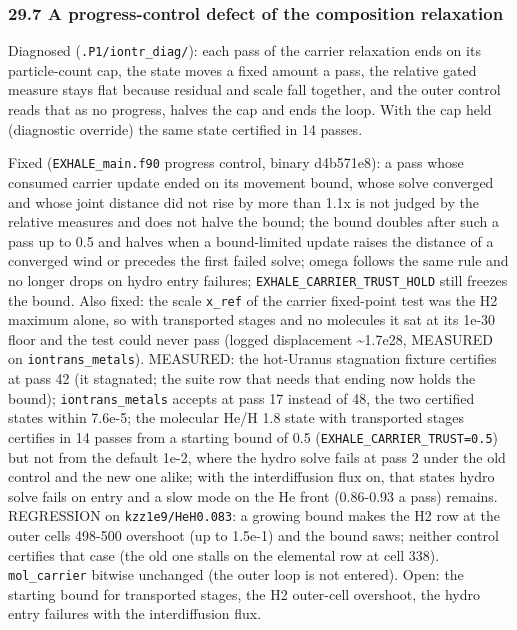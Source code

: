 \documentclass[english,a4paper]{my_memo}
\begin{document}
\subsubsection{29.7 A progress-control defect of the composition relaxation}\label{297-a-progress-control-defect-of-the-composition-relaxation}

Diagnosed (\texttt{.P1/iontr\_diag/}): each pass of the carrier relaxation ends on
its particle-count cap, the state moves a fixed amount a pass, the relative
gated measure stays flat because residual and scale fall together, and the
outer control reads that as no progress, halves the cap and ends the loop.
With the cap held (diagnostic override) the same state certified in 14
passes.

Fixed (\texttt{EXHALE\_main.f90} progress control, binary d4b571e8): a pass whose
consumed carrier update ended on its movement bound, whose solve converged
and whose joint distance did not rise by more than 1.1x is not judged by the
relative measures and does not halve the bound; the bound doubles after such
a pass up to 0.5 and halves when a bound-limited update raises the distance
of a converged wind or precedes the first failed solve; omega follows the
same rule and no longer drops on hydro entry failures;
\texttt{EXHALE\_CARRIER\_TRUST\_HOLD} still freezes the bound. Also fixed: the scale
\texttt{x\_ref} of the carrier fixed-point test was the H2 maximum alone, so with
transported stages and no molecules it sat at its 1e-30 floor and the test
could never pass (logged displacement \textasciitilde1.7e28, MEASURED on
\texttt{iontrans\_metals}). MEASURED: the hot-Uranus stagnation fixture certifies at
pass 42 (it stagnated; the suite row that needs that ending now holds the
bound); \texttt{iontrans\_metals} accepts at pass 17 instead of 48, the two
certified states within 7.6e-5; the molecular He/H 1.8 state with transported
stages certifies in 14 passes from a starting bound of 0.5
(\texttt{EXHALE\_CARRIER\_TRUST=0.5}) but not from the default 1e-2, where the hydro
solve fails at pass 2 under the old control and the new one alike; with the
interdiffusion flux on, that state\textquotesingle s hydro solve fails on entry and a slow
mode on the He front (0.86-0.93 a pass) remains. REGRESSION on
\texttt{kzz1e9/HeH0.083}: a growing bound makes the H2 row at the outer cells
498-500 overshoot (up to 1.5e-1) and the bound saws; neither control
certifies that case (the old one stalls on the elemental row at cell 338).
\texttt{mol\_carrier} bitwise unchanged (the outer loop is not entered). Open: the
starting bound for transported stages, the H2 outer-cell overshoot, the
hydro entry failures with the interdiffusion flux.
\end{document}
